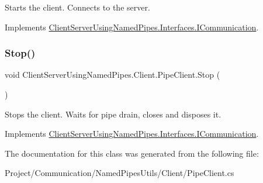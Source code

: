 Starts the client. Connects to the server. 



Implements \hyperlink{interface_client_server_using_named_pipes_1_1_interfaces_1_1_i_communication_ac06ad36a2b8a02d82e385e0eade28671}{Client\+Server\+Using\+Named\+Pipes.\+Interfaces.\+I\+Communication}.

\mbox{\label{class_client_server_using_named_pipes_1_1_client_1_1_pipe_client_a9d442b0b2a19c3d460185a8bb27e36e9}} 
\subsubsection{\texorpdfstring{Stop()}{Stop()}}
{\footnotesize\ttfamily void Client\+Server\+Using\+Named\+Pipes.\+Client.\+Pipe\+Client.\+Stop (\begin{DoxyParamCaption}{ }\end{DoxyParamCaption})\hspace{0.3cm}{\ttfamily [inline]}}



Stops the client. Waits for pipe drain, closes and disposes it. 



Implements \hyperlink{interface_client_server_using_named_pipes_1_1_interfaces_1_1_i_communication_a85ce939996cde20d398e799ca6a900f3}{Client\+Server\+Using\+Named\+Pipes.\+Interfaces.\+I\+Communication}.



The documentation for this class was generated from the following file\+:\begin{DoxyCompactItemize}
\item 
Project/\+Communication/\+Named\+Pipes\+Utils/\+Client/Pipe\+Client.\+cs\end{DoxyCompactItemize}
